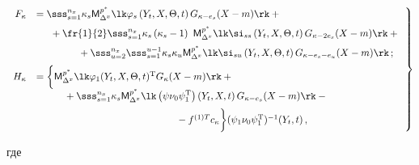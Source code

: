     \begin{equation}

    \left.

    \begin{array}{rl}

    F_\kappa &\displaystyle=\sss_{s=1}^{n_x} \kappa_s

    {\sf M}_{\Delta^x}^{p^*}\lk \varphi_s \left(Y_t,X,\Theta,t\right)

    G_{\kappa-e_s} (X-m)\rk+{}\\[6pt]

&\displaystyle\hspace*{5mm}{}+\fr{1}{2} \sss_{s=1}^{n_x}  \kappa_s \left(\kappa_s-1\right)

    \ {\sf M}_{\Delta^x}^{p^*}\lk \si_{ss} \left(Y_t,X,\Theta,t\right) 

    G_{\kappa-2e_s}(X-m)\rk+{}\\[6pt]

&\hspace*{15mm}\displaystyle{}+ \sss_{u=2}^{n_x} \sss_{s=1}^{u-1}  \kappa_s

    \kappa_u  {\sf M}_{\Delta^x}^{p^*}\lk \si_{su} \left(Y_t,X,\Theta,t\right)

    G_{\kappa-e_s-e_u}(X-m)\rk \,;

\\[6pt]

H_\kappa &= \biggl\{

     {\sf M}_{\Delta^x}^{p^*}\lk

    \varphi_1 (Y_t,X,\Theta,t)^{\mathrm{T}} G_{\kappa} (X-m) \rk+{}\\[6pt]

&\displaystyle\hspace*{10mm}{}+\sss_{s=1}^{n_x} \kappa_s

     {\sf M}_{\Delta^x}^{p^*}\lk \left(\psi\nu_0\psi_1^{\mathrm{T}}\right) 

     \left(Y_t,X,t\right)G_{\kappa-e_s} (X-m) \rk-{}\\[6pt]

&\hspace*{50mm}{}-f^{(1)T} c_\kappa \biggr\} \pss^{-1} (Y_t,t)\,,

\end{array}

\right\}

\label{e4.12-s1}

\end{equation}

где

